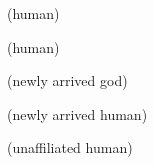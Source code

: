 \documentclass[blue]{guardians}
\begin{document}
\name{\bWhosWho{}}


\begin{itemz}[Greek]
  \item\cZeus{}
  \item\cHera{}
  \item\cAthena{}
  \item\cHephaestus{}
  \item\cPandora{} (human)
\end{itemz}

\begin{itemz}[Norse]
  \item\cOdin{}
  \item\cHel{}
  \item\cFenrir{}
  \item%
\end{itemz}

\begin{itemz}[Egyptians]
  \item\cIsis{}
  \item\cAnubis{}
  \item\cOsiris{}
  \item\cEgyptianHuman{} (human)
\end{itemz}

\begin{itemz}[Others]
  \item\cUnity{} (newly arrived god)
  \item\cKachiko{} (newly arrived human)
  \item\cJascha{} (unaffiliated human)
  \item\cCaretaker{}
  \item\cWarden{}
\end{itemz}
\end{document}
